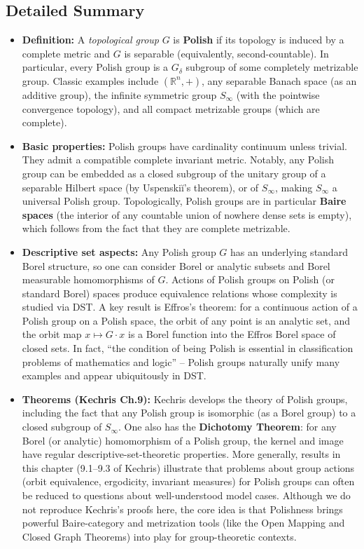 \documentclass[11pt]{article}
\begin{document}
\subsection{Detailed Summary}
\label{detailed-summary}
\begin{itemize}
\item \textbf{Definition:} A \emph{topological group} \(G\) is \textbf{Polish} if its topology
is induced by a complete metric and \(G\) is separable (equivalently,
second-countable). In particular, every Polish group is a \(G_\delta\)
subgroup of some completely metrizable group. Classic examples include
\((\mathbb{R}^n,+)\), any separable Banach space (as an additive
group), the infinite symmetric group \(S_\infty\) (with the pointwise
convergence topology), and all compact metrizable groups (which are
complete).

\item \textbf{Basic properties:} Polish groups have cardinality continuum unless
trivial. They admit a compatible complete invariant metric. Notably,
any Polish group can be embedded as a closed subgroup of the unitary
group of a separable Hilbert space (by Uspenskiĭ's theorem), or of
\(S_\infty\), making \(S_\infty\) a universal Polish group.
Topologically, Polish groups are in particular \textbf{Baire spaces} (the
interior of any countable union of nowhere dense sets is empty), which
follows from the fact that they are complete metrizable.

\item \textbf{Descriptive set aspects:} Any Polish group \(G\) has an underlying
standard Borel structure, so one can consider Borel or analytic
subsets and Borel measurable homomorphisms of \(G\). Actions of Polish
groups on Polish (or standard Borel) spaces produce equivalence
relations whose complexity is studied via DST. A key result is
Effros's theorem: for a continuous action of a Polish group on a
Polish space, the orbit of any point is an analytic set, and the orbit
map \(x\mapsto G\cdot x\) is a Borel function into the Effros Borel
space of closed sets. In fact, “the condition of being Polish is
essential in classification problems of mathematics and logic” --
Polish groups naturally unify many examples and appear ubiquitously in
DST.

\item \textbf{Theorems (Kechris Ch.9):} Kechris develops the theory of Polish
groups, including the fact that any Polish group is isomorphic (as a
Borel group) to a closed subgroup of \(S_\infty\). One also has the
\textbf{Dichotomy Theorem}: for any Borel (or analytic) homomorphism of a
Polish group, the kernel and image have regular
descriptive-set-theoretic properties. More generally, results in this
chapter (9.1--9.3 of Kechris) illustrate that problems about group
actions (orbit equivalence, ergodicity, invariant measures) for Polish
groups can often be reduced to questions about well-understood model
cases. Although we do not reproduce Kechris's proofs here, the core
idea is that Polishness brings powerful Baire-category and metrization
tools (like the Open Mapping and Closed Graph Theorems) into play for
group-theoretic contexts.


\end{itemize}
\end{document}
